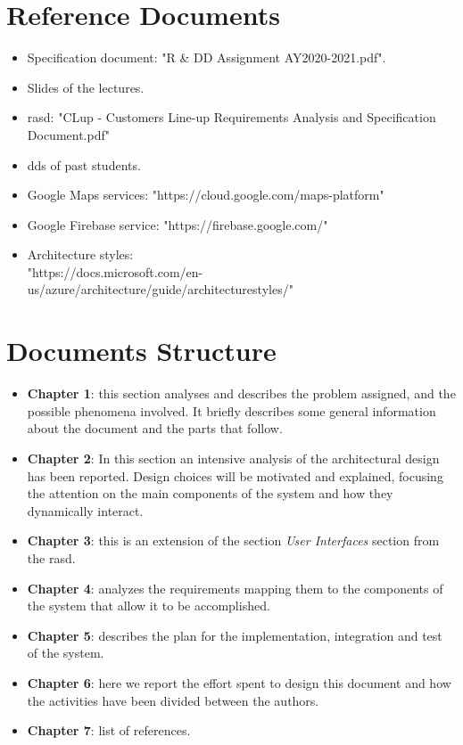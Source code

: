 \section{Reference Documents}

\begin{itemize}
    \item Specification document: "R \& DD Assignment AY2020-2021.pdf".
    \item Slides of the lectures.
    \item \gls{rasd}: "CLup - Customers Line-up Requirements Analysis and Specification Document.pdf"
	\item \glspl{dd} of past students.
    \item Google Maps services: "https://cloud.google.com/maps-platform"
    \item Google Firebase service: "https://firebase.google.com/"
    \item Architecture styles:\\ "https://docs.microsoft.com/en-us/azure/architecture/guide/architecturestyles/"
\end{itemize}



\section{Documents Structure}

\begin{itemize}
	\item \textbf{Chapter 1}: this section analyses and describes the problem assigned, and the possible phenomena involved. It briefly describes some general information about the document and the parts that follow.
	\item \textbf{Chapter 2}: In this section an intensive analysis of the architectural design has been reported. Design choices will be motivated and explained, focusing the attention on the main components of the system and how they dynamically interact.
	\item \textbf{Chapter 3}: this is an extension of the section \textit{User Interfaces} section from the \gls{rasd}.
	\item \textbf{Chapter 4}: analyzes the requirements mapping them to the components of the system that allow it to be accomplished.
	\item \textbf{Chapter 5}: describes the plan for the implementation, integration and test of the system.
	\item \textbf{Chapter 6}: here we report the effort spent to design this document and how the activities have been divided between the authors.
	\item \textbf{Chapter 7}: list of references.
\end{itemize}